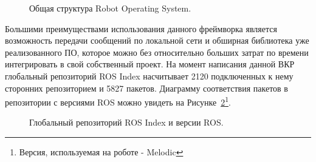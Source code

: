 \begin{figure}[ht]
  \caption{Общая структура Robot Operating System.}\label{fig:ros-compute-graph}
\end{figure}


Большими преимуществами использования данного фреймворка является возможность передачи сообщений по локальной сети и обширная библиотека уже реализованного ПО, которое можно без относительно больших затрат по времени интегрировать в свой собственный проект. На момент написания данной ВКР глобальный репозиторий ROS Index насчитывает 2120 подключенных к нему сторонних репозиторием и 5827 пакетов. Диаграмму соответствия пакетов в репозитории с версиями ROS можно увидеть на Рисунке~\ref{fig:ros-index}\footnote{Версия, используемая на роботе - Melodic}.

\begin{figure}[ht]
  \caption{Глобальный репозиторий ROS Index и версии ROS.}\label{fig:ros-index}
\end{figure}

